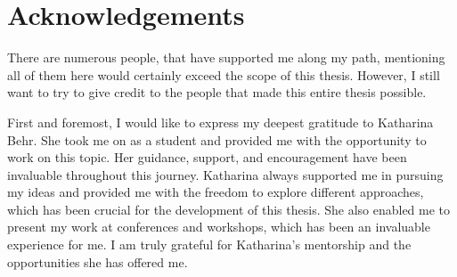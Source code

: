 \documentclass[master,
  oneside,
  BCOR=10mm,
  ngerman,
  english,
  final,%
]{GAUBM}
\begin{document}
\begin{abstract}
  Using a simplified analysis setup, the model's ability to improve the measurement sensitivity is demonstrated. Comparison of distributions from \atlas event data and simulated events indicates the model's readiness for application in a full analysis context. 
  
  The method presented is the first machine learning tool to provide a complete reconstruction of the dileptonic decay channel that is available in the \atlas Collaboration's official software repository. Application of these tools to current and future analyses is expected to substantially enhance the sensitivity and precision of searches and measurements.
  \bigskip\par
  \textbf{Keywords:} Top Quark, Dileptonic Decay, Event
  Reconstruction, Machine Learning, Transformer Networks
\end{abstract}

\cleardoublepage
\tableofcontents
\mainmatter











\appendix



\cleardoublepage



\chapter*{Acknowledgements}
There are numerous people, that have supported me along my path, mentioning all of them here would certainly exceed the scope of this thesis. However, I still want to try to give credit to the people that made this entire thesis possible.

First and foremost, I would like to express my deepest gratitude to Katharina Behr. She took me on as a student and provided me with the opportunity to work on this topic. Her guidance, support, and encouragement have been invaluable throughout this journey. Katharina always supported me in pursuing my ideas and provided me with the freedom to explore different approaches, which has been crucial for the development of this thesis. She also enabled me to present my work at conferences and workshops, which has been an invaluable experience for me. I am truly grateful for Katharina's mentorship and the opportunities she has offered me.
\end{document}

